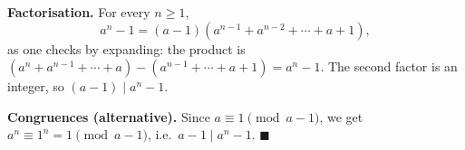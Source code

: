 \textbf{Factorisation.} For every $n\ge1$,
\[
a^n-1=(a-1)\left(a^{n-1}+a^{n-2}+\cdots+a+1\right),
\]
as one checks by expanding: the product is $(a^n+a^{n-1}+\cdots+a)-(a^{n-1}+\cdots+a+1)=a^n-1$. The second factor is an integer, so $(a-1)\mid a^n-1$.

\textbf{Congruences (alternative).} Since $a\equiv1\pmod{a-1}$, we get $a^n\equiv1^n=1\pmod{a-1}$, i.e.\ $a-1\mid a^n-1$. $\blacksquare$
